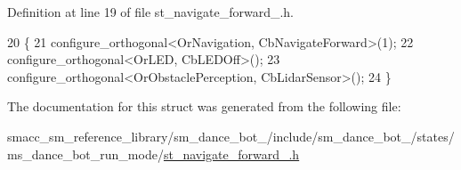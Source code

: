 Definition at line 19 of file st\+\_\+navigate\+\_\+forward\+\_.\+h.


\begin{DoxyCode}
20   \{
21     configure\_orthogonal<OrNavigation, CbNavigateForward>(1);
22     configure\_orthogonal<OrLED, CbLEDOff>();
23     configure\_orthogonal<OrObstaclePerception, CbLidarSensor>();
24   \}
\end{DoxyCode}


The documentation for this struct was generated from the following file\+:\begin{DoxyCompactItemize}
\item 
smacc\+\_\+sm\+\_\+reference\+\_\+library/sm\+\_\+dance\+\_\+bot\+\_/include/sm\+\_\+dance\+\_\+bot\+\_/states/ms\+\_\+dance\+\_\+bot\+\_\+run\+\_\+mode/\hyperlink{sm__dance__bot__2_2include_2sm__dance__bot__2_2states_2ms__dance__bot__run__mode_2st__navigate__forward__1_8h}{st\+\_\+navigate\+\_\+forward\+\_.\+h}\end{DoxyCompactItemize}
